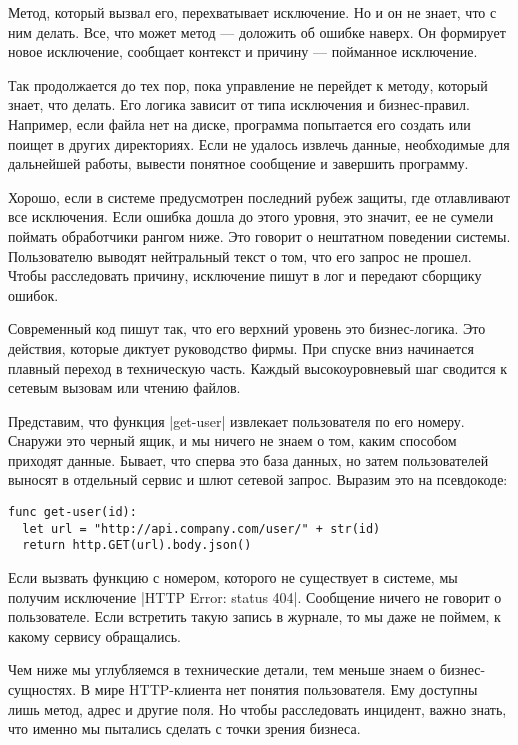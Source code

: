 Метод, который вызвал его, перехватывает исключение. Но и он не знает, что с ним
делать. Все, что может метод — доложить об ошибке наверх. Он формирует новое
исключение, сообщает контекст и причину — пойманное исключение.

Так продолжается до тех пор, пока управление не перейдет к методу, который
знает, что делать. Его логика зависит от типа исключения и
бизнес-правил. Например, если файла нет на диске, программа попытается его
создать или поищет в других директориях. Если не удалось извлечь данные,
необходимые для дальнейшей работы, вывести понятное сообщение и завершить
программу.

Хорошо, если в системе предусмотрен последний рубеж защиты, где отлавливают все
исключения. Если ошибка дошла до этого уровня, это значит, ее не сумели поймать
обработчики рангом ниже. Это говорит о нештатном поведении системы. Пользователю
выводят нейтральный текст о том, что его запрос не прошел. Чтобы расследовать
причину, исключение пишут в лог и передают сборщику ошибок.

Современный код пишут так, что его верхний уровень это бизнес-логика. Это
действия, которые диктует руководство фирмы. При спуске вниз начинается плавный
переход в техническую часть. Каждый высокоуровневый шаг сводится к сетевым
вызовам или чтению файлов.

Представим, что функция \spverb|get-user| извлекает пользователя по его номеру. Снаружи
это черный ящик, и мы ничего не знаем о том, каким способом приходят
данные. Бывает, что сперва это база данных, но затем пользователей выносят в
отдельный сервис и шлют сетевой запрос. Выразим это на псевдокоде:

\begin{verbatim}
func get-user(id):
  let url = "http://api.company.com/user/" + str(id)
  return http.GET(url).body.json()
\end{verbatim}

Если вызвать функцию с номером, которого не существует в системе, мы получим
исключение \spverb|HTTP Error: status 404|. Сообщение ничего не говорит о
пользователе. Если встретить такую запись в журнале, то мы даже не поймем, к
какому сервису обращались.

Чем ниже мы углубляемся в технические детали, тем меньше знаем о
бизнес-сущностях. В мире HTTP-клиента нет понятия пользователя. Ему доступны
лишь метод, адрес и другие поля. Но чтобы расследовать инцидент, важно знать,
что именно мы пытались сделать с точки зрения бизнеса.

